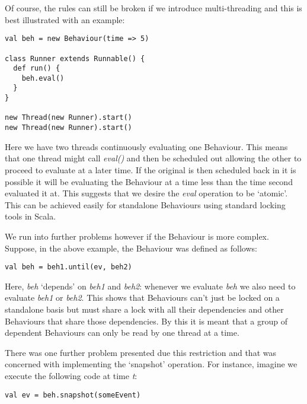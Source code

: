       Of course, the rules can still be broken if we introduce multi-threading and this is best illustrated
      with an example:
      
\begin{verbatim}
val beh = new Behaviour(time => 5)

class Runner extends Runnable() {
  def run() {
    beh.eval()
  }
}

new Thread(new Runner).start()
new Thread(new Runner).start()
\end{verbatim}       

      Here we have two threads continuously evaluating one Behaviour. This means that one thread
      might call \emph{eval()} and then be scheduled out allowing the other to proceed to evaluate
      at a later time. If the original is then scheduled back in it is possible it will
      be evaluating the Behaviour at a time less than the time second evaluated it at. This suggests
      that we desire the \emph{eval} operation to be `atomic'. This can be achieved easily for standalone
      Behaviours using standard locking tools in Scala.
      
      We run into further problems however if the Behaviour is more complex. Suppose, in the above example,
      the Behaviour was defined as follows:

\begin{verbatim}
val beh = beh1.until(ev, beh2)
\end{verbatim}        

      Here, \emph{beh} `depends' on \emph{beh1} and \emph{beh2}: whenever we evaluate \emph{beh}
      we also need to evaluate \emph{beh1} or \emph{beh2}. This shows that Behaviours can't just
      be locked on a standalone basis but must share a lock with all their dependencies and other Behaviours
      that share those dependencies. By this it is meant that a group of dependent Behaviours can
      only be read by one thread at a time.
      
      There was one further problem presented due this restriction and that was concerned with
      implementing the `snapshot' operation. For instance, imagine we execute the following code
      at time \emph{t}:
      
\begin{verbatim}
val ev = beh.snapshot(someEvent)
\end{verbatim}

